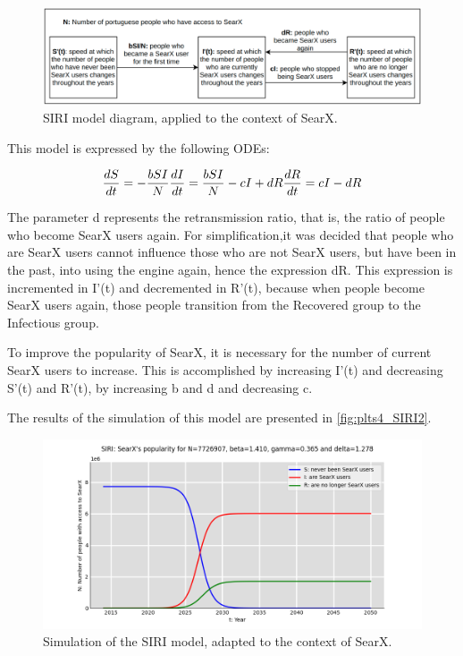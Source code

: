 \documentclass{article}
\begin{document}
\begin{figure}[h]
    \centering
    \includegraphics[width=0.8\linewidth]{SIRI}
    \caption{‌SIRI‌ ‌model‌ ‌diagram,‌ ‌applied‌ ‌to‌ ‌the‌ ‌context‌ ‌of‌ ‌SearX.‌}
    \label{fig:SIRI}
\end{figure}

This‌ ‌model‌ ‌is‌ ‌expressed‌ ‌by‌ ‌the‌ ‌following‌ ‌ODEs:‌

\begin{equation}
    \begin{subequations}
        \frac{dS}{dt} = - \frac{bSI}{N}
        \frac{dI}{dt} = \frac{bSI}{N} - cI + dR
        \frac{dR}{dt} = cI - dR
    \end{subequations}
    \label{eq:SEIRIinitialConditions}
\end{equation}

The‌ ‌parameter‌ ‌d‌ ‌represents‌ ‌the‌ ‌retransmission‌ ‌ratio,‌ ‌that‌ ‌is,‌ ‌the‌ ‌ratio‌ ‌of ‌‌people‌‌ who‌‌ become‌‌ SearX‌ ‌users‌ ‌again.‌ ‌For‌ ‌simplification,‌‌it ‌‌was ‌‌decided ‌‌that‌‌ people‌‌ who‌‌ are‌‌ SearX‌‌ users‌‌ cannot‌‌ influence‌ ‌those‌ ‌who‌ ‌are‌ ‌not‌ ‌SearX‌ ‌users,‌ ‌but‌ ‌have‌ ‌been‌ ‌in‌ ‌the‌ ‌past,‌ ‌into‌ ‌using‌ ‌the‌ ‌engine‌‌ again,‌ ‌hence‌ ‌the‌ ‌expression‌ ‌dR.‌ ‌This‌ ‌expression‌ ‌is‌ ‌incremented‌ ‌in‌ ‌I'(t)‌ ‌and‌ ‌decremented‌ ‌in‌‌ R'(t),‌ ‌because‌ ‌when‌ ‌people‌ ‌become‌ ‌SearX‌ ‌users‌ ‌again,‌ ‌those‌ ‌people‌ ‌transition‌ ‌from‌ ‌the‌‌ Recovered‌ ‌group‌ ‌to‌ ‌the‌ ‌Infectious‌ ‌group.‌ ‌

To‌ ‌improve‌ ‌the‌ ‌popularity‌ ‌of‌ ‌SearX,‌ ‌it‌ ‌is‌ ‌necessary‌ ‌for‌ ‌the‌ ‌number‌ ‌of‌ ‌current‌ ‌SearX‌ ‌users‌‌ to‌‌ increase. ‌‌This‌‌ is‌‌ accomplished‌‌ by‌‌ increasing ‌‌I’(t) ‌‌and‌‌ decreasing‌‌ S'(t)‌‌ and‌‌ R'(t),‌‌ by‌‌ increasing‌‌ b‌‌ and‌ ‌d‌ ‌and‌ ‌decreasing‌ ‌c.‌

The‌ ‌results‌ ‌of‌ ‌the‌ ‌simulation‌ ‌of‌ ‌this‌ ‌model‌ ‌are‌ ‌presented‌ ‌in‌ \autoref{fig:plts4_SIRI2}.

\begin{figure}[h]
    \centering
    \includegraphics[width=0.8\linewidth]{plts4_SIRI2}
    \caption{‌‌Simulation‌ ‌of‌ ‌the‌ ‌SIR‌I ‌model,‌ ‌adapted‌ ‌to‌ ‌the‌ ‌context‌ ‌of‌ ‌SearX.‌‌‌‌}
    \label{fig:plts4_SIRI2}
\end{figure}
\end{document}
